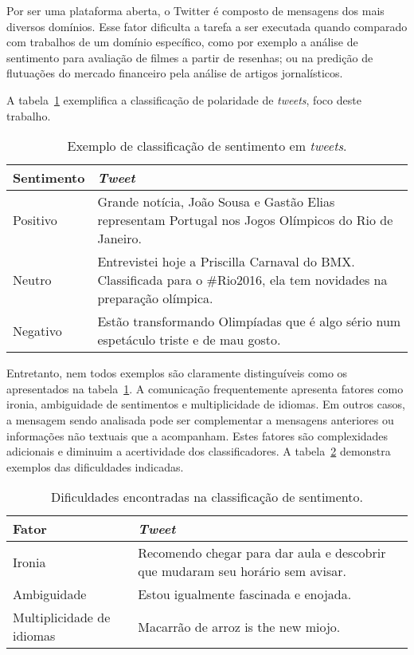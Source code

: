 Por ser uma plataforma aberta, o Twitter é composto de mensagens dos mais diversos domínios.
Esse fator dificulta a tarefa a ser executada quando comparado com trabalhos de um domínio específico, como por exemplo
a análise de sentimento para avaliação de filmes a partir de resenhas; ou na predição de flutuações do mercado
financeiro pela análise de artigos jornalísticos.

A tabela~\ref{tab:sentiment} exemplifica a classificação de polaridade de \textit{tweets}, foco deste trabalho.

\begin{table}[h]
    \begin{center}
        \begin{tabular}{| l | p{10cm} |}
        \hline
        \textbf{Sentimento} & \textbf{\textit{Tweet}} \\ \hline
        Positivo & Grande notícia, João Sousa e Gastão Elias representam Portugal nos Jogos Olímpicos do Rio de Janeiro.
        \\ \hline
        Neutro & Entrevistei hoje a Priscilla Carnaval do BMX. Classificada para o \#Rio2016, ela tem novidades na
        preparação olímpica. \\ \hline
        Negativo & Estão transformando Olimpíadas que é algo sério num espetáculo triste e de mau gosto. \\ \hline
        \end{tabular}
        \caption{Exemplo de classificação de sentimento em \textit{tweets}.}
        \label{tab:sentiment}
    \end{center}
\end{table}

Entretanto, nem todos exemplos são claramente distinguíveis como os apresentados na tabela~\ref{tab:sentiment}.
A comunicação frequentemente apresenta fatores como ironia, ambiguidade de sentimentos e multiplicidade de idiomas.
Em outros casos, a mensagem sendo analisada pode ser complementar a mensagens anteriores ou informações não textuais
que a acompanham.
Estes fatores são complexidades adicionais e diminuim a acertividade dos classificadores.
A tabela~\ref{tab:sentiment_complexity} demonstra exemplos das dificuldades indicadas.

\begin{table}[h]
    \begin{center}
        \begin{tabular}{| l | p{10cm} |}
        \hline
        \textbf{Fator} & \textbf{\textit{Tweet}} \\ \hline
        Ironia & Recomendo chegar para dar aula e descobrir que mudaram seu horário sem avisar. \\ \hline
        Ambiguidade & Estou igualmente fascinada e enojada. \\ \hline
        Multiplicidade de idiomas & Macarrão de arroz is the new miojo. \\ \hline
        \end{tabular}
        \caption{Dificuldades encontradas na classificação de sentimento.}
        \label{tab:sentiment_complexity}
    \end{center}
\end{table}

